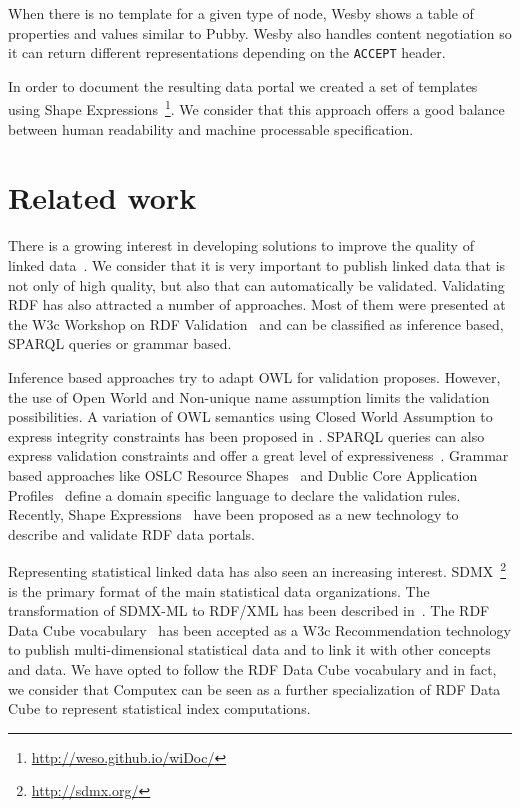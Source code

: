 \documentclass{llncs}
\begin{document}
When there is no template for a given type of node, Wesby shows a table of properties and values similar to Pubby. Wesby also handles content negotiation so it can return different representations depending on the \lstinline|ACCEPT| header.

In order to document the resulting data portal we created a set of templates using Shape Expressions~\footnote{\url{http://weso.github.io/wiDoc/}}. We consider that this approach offers a good balance between human readability and machine processable specification. 
  
\section{Related work}

There is a growing interest in developing solutions to improve the quality of linked data~\cite{hogan10,Mendes12,kontokostasDatabugger}. 
We consider that it is very important to publish linked data that is not only of high
 quality, but also that can automatically be validated. 
 Validating RDF has also attracted a number of approaches. 
 Most of them were presented at the W3c Workshop on RDF Validation~\cite{RDFValidation} and can
be classified as inference based, SPARQL queries or grammar based.

Inference based approaches try to adapt
OWL for validation proposes. 
However, the use of Open World and Non-unique name assumption limits the
validation possibilities. 
A variation of OWL semantics using Closed World Assumption to express integrity constraints has been proposed in \cite{ClarkSirin13,Tiao10,Motik07}.
SPARQL queries can also express validation constraints and offer a great level of expressiveness~\cite{Labra13}. 
Grammar based approaches like OSLC Resource Shapes~\cite{OSLCResourceShapes} and Dublic Core Application Profiles~\cite{KarenCoyleTomBaker13} define a domain specific language to declare the validation rules. Recently, Shape Expressions~\cite{Boneva2014} have been proposed as a new technology to describe and validate RDF data portals. 

Representing statistical linked data has also seen an increasing interest. 
SDMX~\footnote{\url{http://sdmx.org/}} is the primary format of the main statistical data organizations. The transformation of SDMX-ML to RDF/XML has been described in~\cite{Capadisli13}.
The RDF Data Cube vocabulary~\cite{Cube} has been accepted as a W3c Recommendation technology to publish multi-dimensional statistical data and to link it with other concepts and data. 
We have opted to follow the RDF Data Cube vocabulary and in fact, we consider that Computex can be seen as a further specialization of RDF Data Cube to represent statistical index computations.
\end{document}
